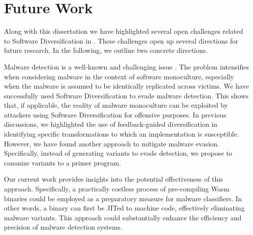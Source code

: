 
\section{Future Work}

Along with this dissertation we have highlighted several open challenges related to Software Diversification in \Wasm.
These challenges open up several directions for future research.
In the following, we outline two concrete directions.



\begin{strategy}

    Malware detection is a well-known and challenging issue \cite{cohen1987computer}. 
    The problem intensifies when considering malware in the context of software monoculture, especially when the malware is assumed to be identically replicated across victims. 
    We have successfully used Software Diversification to evade malware detection. 
    This shows that, if applicable, the reality of malware monoculture can be exploited by attackers using Software Diversification for offensive purposes. 
    In previous discussions, we highlighted the use of feedback-guided diversification in identifying specific transformations to which an implementation is susceptible. 
    However, we have found another approach to mitigate malware evasion. 
    Specifically, instead of generating variants to evade detection, we propose to canonize variants to a primer program.

    


    Our current work provides insights into the potential effectiveness of this approach. 
    Specifically, a practically costless process of pre-compiling Wasm binaries could be employed as a preparatory measure for malware classifiers. 
    In other words, a \wasm binary can first be JITed to machine code, effectively eliminating malware variants. 
    This approach could substantially enhance the efficiency and precision of malware detection systems.

    
\end{strategy}

